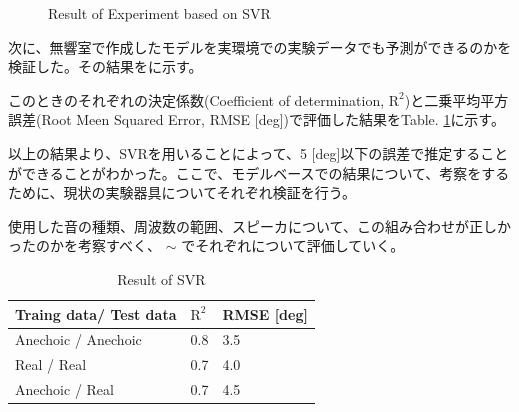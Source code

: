 \begin{figure}[b]
    \centering
    \label{fig:result_svr_anechoic}
    \vspace{2zh}
    \label{fig:result_svr_real}
    \vspace{1zh}
    \caption{Result of Experiment based on SVR}
    \label{fig:result_svr_1}
\end{figure}

次に、無響室で作成したモデルを実環境での実験データでも予測ができるのかを検証した。その結果をに示す。

このときのそれぞれの決定係数(Coefficient of determination, $\mathrm{R}^2$)と二乗平均平方誤差(Root Meen Squared Error, RMSE [deg])で評価した結果をTable. \ref{tab:result_svr_r2_rmse}に示す。

以上の結果より、SVRを用いることによって、5 [deg]以下の誤差で推定することができることがわかった。ここで、モデルベースでの結果について、考察をするために、現状の実験器具についてそれぞれ検証を行う。

使用した音の種類、周波数の範囲、スピーカについて、この組み合わせが正しかったのかを考察すべく、 $\sim$ でそれぞれについて評価していく。

\begin{table}[ht]
\caption{Result of SVR}    
\vspace{1zh}
\centering
  \begin{tabular}{|l|p{6em}|p{6em}|} \hline
    Traing data/ Test data & $\mathrm{R}^2$ & RMSE [deg] \\ \hline\hline 
    Anechoic / Anechoic & 0.8 &  3.5 \\ \hline 
    Real / Real & 0.7 &  4.0 \\ \hline
    Anechoic / Real & 0.7 &  4.5 \\ \hline
  \end{tabular}
  \label{tab:result_svr_r2_rmse}
\end{table}


